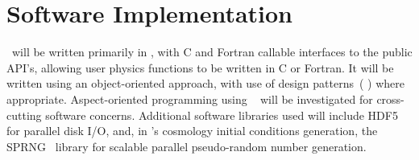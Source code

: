 \documentclass[11pt,letterpaper]{article}
\begin{document}
% 
% 

\section{Software Implementation} \label{s:implementation}

\cello\ will be written primarily in \cpp, with C and Fortran callable
interfaces to the public API's, allowing user physics functions to be
written in C or Fortran.  It will be written using an object-oriented
approach, with use of design patterns~(\cite{GaHe95} \cite{BuHe07})
where appropriate.  Aspect-oriented programming using
~\cite{wwwaspectcpp} will be investigated for
cross-cutting software concerns.  Additional software libraries used
will include HDF5~\cite{hdf5} for parallel disk I/O, and, in \enzoii's
cosmology initial conditions generation, the SPRNG~\cite{wwwsprng}
library for scalable parallel pseudo-random number generation.
\end{document}
